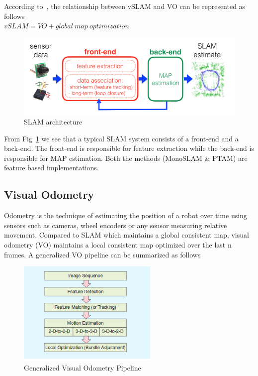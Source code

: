 According to~\cite{scaramuzza2011visual}, the relationship between vSLAM and VO can be represented as follows\\

$vSLAM = VO + global\ map\ optimization$\\


\begin{figure}
  \includegraphics[width=\textwidth]{./figures/slam_model.png}
\caption{SLAM architecture~\cite{cadena2016past}}
\label{fig:slammodel}       %
\end{figure}

From Fig~\ref{fig:slammodel} we see that a typical SLAM system consists of a front-end and a back-end. The front-end is responsible for feature extraction while the back-end is responsible for MAP estimation. Both the methods (MonoSLAM \& PTAM) are feature based implementations. 

\subsection{Visual Odometry}

Odometry is the technique of estimating the position of a robot over time using sensors such as cameras,  wheel encoders or any sensor measuring relative movement. Compared to SLAM which maintains a global consistent map, visual odometry (VO) maintains a local consistent map optimized over the last n frames. A generalized VO pipeline can be summarized as follows

\begin{figure}[!htb]
  \includegraphics[width=\textwidth,height=5cm,keepaspectratio]{./figures/vo.png}
\caption{Generalized Visual Odometry Pipeline~\cite{scaramuzza2011visual}}
\label{fig:vo}       %
\end{figure}

